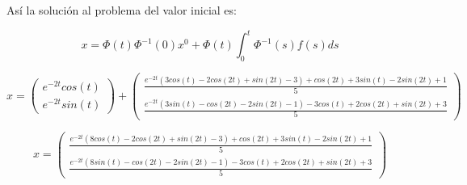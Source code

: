 Así la solución al problema del valor inicial es: 

$$x= \Phi(t) \Phi^{-1}(0)x^{0}+ \Phi(t) \int^{t}_{0} \Phi^{-1}(s)f(s) ds$$

$$x=
\begin{pmatrix}
e^{-2t}cos(t)\\
e^{-2t}sin(t)
\end{pmatrix}+
\begin{pmatrix}
\frac{e^{-2t}(3cos(t)-2cos(2t)+sin(2t)-3)+cos(2t)+3sin(t)-2sin(2t)+1}{5}\\
\frac{e^{-2t}(3sin(t)-cos(2t)-2sin(2t)-1)-3cos(t)+2cos(2t)+sin(2t)+3}{5}
\end{pmatrix}$$

$$x= \begin{pmatrix}
\frac{e^{-2t}(8cos(t)-2cos(2t)+sin(2t)-3)+cos(2t)+3sin(t)-2sin(2t)+1}{5}\\
\frac{e^{-2t}(8sin(t)-cos(2t)-2sin(2t)-1)-3cos(t)+2cos(2t)+sin(2t)+3}{5}
\end{pmatrix}$$
